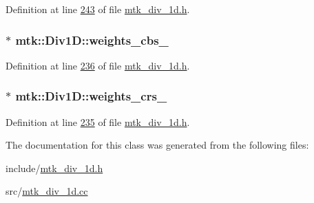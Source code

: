 Definition at line \hyperlink{mtk__div__1d_8h_source_l00243}{243} of file \hyperlink{mtk__div__1d_8h_source}{mtk\+\_\+div\+\_\+1d.\+h}.

\hypertarget{classmtk_1_1Div1D_a631dad42a0ec0f5d5ac767abdfd8949c}{
\subsubsection[{weights\+\_\+cbs\+\_\+}]{$\ast$ mtk\+::\+Div1\+D\+::weights\+\_\+cbs\+\_\+\hspace{0.3cm}{\ttfamily [private]}}}\label{classmtk_1_1Div1D_a631dad42a0ec0f5d5ac767abdfd8949c}


Definition at line \hyperlink{mtk__div__1d_8h_source_l00236}{236} of file \hyperlink{mtk__div__1d_8h_source}{mtk\+\_\+div\+\_\+1d.\+h}.

\hypertarget{classmtk_1_1Div1D_ad36dcfade921f0488fe3edaecc17bd75}{
\subsubsection[{weights\+\_\+crs\+\_\+}]{$\ast$ mtk\+::\+Div1\+D\+::weights\+\_\+crs\+\_\+\hspace{0.3cm}{\ttfamily [private]}}}\label{classmtk_1_1Div1D_ad36dcfade921f0488fe3edaecc17bd75}


Definition at line \hyperlink{mtk__div__1d_8h_source_l00235}{235} of file \hyperlink{mtk__div__1d_8h_source}{mtk\+\_\+div\+\_\+1d.\+h}.



The documentation for this class was generated from the following files\+:\begin{DoxyCompactItemize}
\item 
include/\hyperlink{mtk__div__1d_8h}{mtk\+\_\+div\+\_\+1d.\+h}\item 
src/\hyperlink{mtk__div__1d_8cc}{mtk\+\_\+div\+\_\+1d.\+cc}\end{DoxyCompactItemize}
